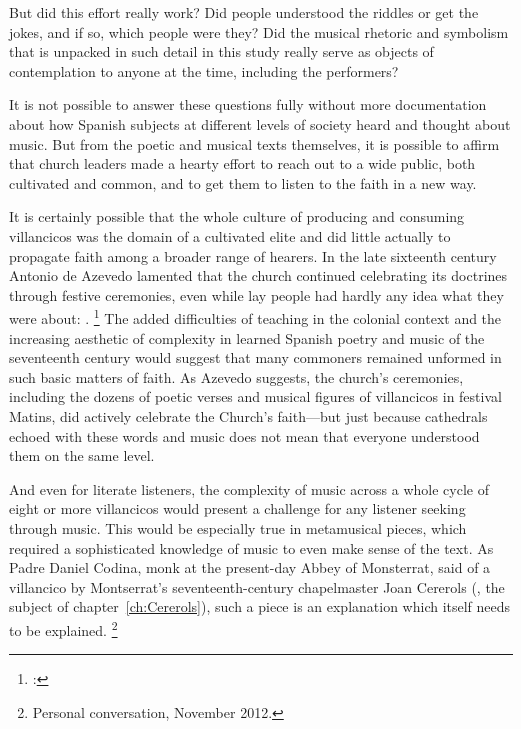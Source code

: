 But did this effort really work?
Did people understood the riddles or get the jokes, and if so, which people were they? 
Did the musical rhetoric and symbolism that is unpacked in such detail in this study really serve as objects of contemplation to anyone at the time, including the performers?

It is not possible to answer these questions fully without more documentation about how Spanish subjects at different levels of society heard and thought about music.
But from the poetic and musical texts themselves, it is possible to affirm that church leaders made a hearty effort to reach out to a wide public, both cultivated and common, and to get them to listen to the faith in a new way.

It is certainly possible that the whole culture of producing and consuming villancicos was the domain of a cultivated elite and did little actually to propagate faith among a broader range of hearers.
In the late sixteenth century Antonio de Azevedo lamented that the church continued celebrating its doctrines through festive ceremonies, even while lay people had hardly any idea what they were about:
.%
	\footnote{%
	\autocite[27]{Azevedo:Catecismo}:
	}
The added difficulties of teaching in the colonial context and the increasing aesthetic of complexity in learned Spanish poetry and music of the seventeenth century would suggest that many commoners remained unformed in such basic matters of faith.
As Azevedo suggests, the church's ceremonies, including the dozens of poetic verses and musical figures of villancicos in festival Matins, did actively celebrate the Church's faith---but just because cathedrals echoed with these words and music does not mean that everyone understood them on the same level.

And even for literate listeners, the complexity of music across a whole cycle of eight or more villancicos would present a challenge for any listener seeking  through music.
This would be especially true in metamusical pieces, which required a sophisticated knowledge of music to even make sense of the text.
As Padre Daniel Codina, monk at the present-day Abbey of Monsterrat, said of a villancico by Montserrat's seventeenth-century chapelmaster Joan Cererols (, the subject of chapter~\ref{ch:Cererols}), such a piece is an explanation which itself needs to be explained.%
	\footnote{%
	Personal conversation, November 2012.
	}

\endinput
